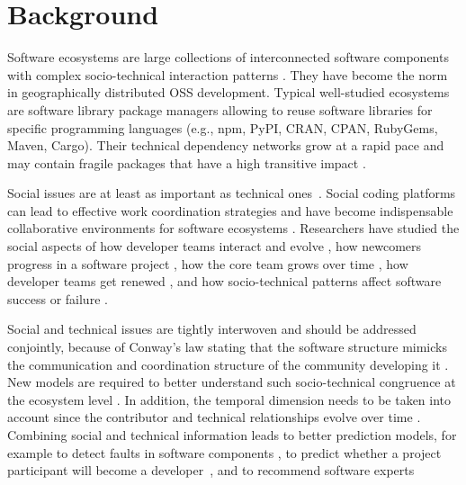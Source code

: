 

\section{Background}

Software ecosystems are large collections of interconnected software components with complex socio-technical interaction patterns \cite{Lungu2009,ManikasHansen2013}. They have become the norm in geographically distributed OSS  development. Typical well-studied ecosystems are software library package managers \cite{Decan2017SANER,Kikas2017,Dietrich2019} allowing to reuse software libraries for specific programming languages (e.g., npm, PyPI, CRAN, CPAN, RubyGems, Maven, Cargo). Their technical dependency networks grow at a rapid pace and may contain fragile packages that have a high transitive impact \cite{Decan2019EMSE}. 

Social issues are at least as important as technical ones~\cite{Mens2019IEEESW}. Social coding platforms can lead to effective work coordination strategies \cite{DabbishSTH12} and have become indispensable collaborative environments for software ecosystems \cite{Herbsleb1999}.
Researchers have studied the social aspects of how developer teams interact and evolve \cite{lopezfernandez2006:sna}, how newcomers progress in a software project \cite{Zhou2011-ICSE,Zhou2012-ICSE}, how the core team grows over time \cite{Robles2009MSR}, how developer teams get renewed \cite{Constantinou2017SANER}, and how socio-technical patterns affect software success or failure \cite{SurianTLCL13}. 

Social and technical issues are tightly interwoven and should be addressed conjointly, because of Conway's law stating that the software structure mimicks the communication and coordination structure of the community developing it \cite{Conway1968, Herbsleb1999, Kwan2011,Blincoe2019}. New models are required to better understand such socio-technical congruence at the ecosystem level \cite{Palyart2018TSE}. In addition, the temporal dimension needs to be taken into account since the contributor and technical relationships evolve over time \cite{Cataldo2008}.
Combining social and technical information leads to better prediction models, for example to detect faults in software components \cite{Bird2009,Bhattacharya2012}, to predict whether a project participant will become a developer~\cite{Gharehyazie2013-ICSM}, and to recommend software experts \cite{Kintab:2014:RSE:2735522.2735526}

